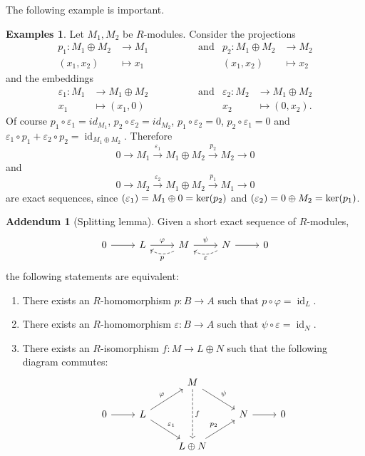 \documentclass[12pt,a4paper]{report}
\theoremstyle{definition}
\newtheorem*{addendum}{Addendum}
\newtheorem*{examples}{Examples}
\theoremstyle{num.custom-title}
\DeclareMathOperator{\id}{id}
\let\o\relax %
\DeclareMathOperator{\o}{\mathsf{o}}
\let\Im\relax %
\DeclareMathOperator{\Im}{Im}
\renewcommand{\epsilon}{\varepsilon}
\renewcommand{\phi}{\varphi}
\begin{document}
The following example is important.

\begin{examples}
Let $M_1,M_2$ be $R$-modules. Consider the projections
\begin{align*}
p_1 \colon M_1 \oplus M_2 &\to M_1  \quad \quad \quad \quad \quad \text{and}  & p_2 \colon M_1 \oplus M_2 &\to M_2 \\
(x_1,x_2) &\mapsto x_1    &(x_1,x_2) &\mapsto x_2
\end{align*}
and the embeddings
\begin{align*}
\epsilon_1 \colon M_1 &\to M_1 \oplus M_2  \quad \quad \quad \quad \quad \text{and}  & \epsilon_2 \colon M_2 &\to M_1 \oplus M_2 \\
x_1 &\mapsto (x_1,0)    & x_2 &\mapsto (0,x_2).
\end{align*}
Of course $p_1 \circ \epsilon_1 = id_{M_1}$, $p_2 \circ \epsilon_2 = id_{M_2}$, $p_1 \circ \epsilon_2 = 0$, $p_2 \circ \epsilon_1 = 0$ and $\epsilon_1 \circ p_1 + \epsilon_2 \circ p_2 = \id_{M_1 \oplus M_2}$. Therefore
\[
0 \to M_1 \stackrel{\epsilon_1}{\to} M_1 \oplus M_2 \stackrel{p_2}{\to} M_2 \to 0
\]
and
\[
0 \to M_2 \stackrel{\epsilon_2}{\to} M_1 \oplus M_2 \stackrel{p_1}{\to} M_1 \to 0
\]
are exact sequences, since $\Im(\epsilon_1) = M_1 \oplus 0 = \ker(p_2)$ and $\Im(\epsilon_2) = 0 \oplus M_2 = \ker(p_1)$.
\end{examples}

\begin{addendum}[Splitting lemma]
Given a short exact sequence of $R$-modules, 
\[
\begin{tikzcd}
0 \arrow{r} & L \arrow{r}{\phi} & M \arrow{r}{\psi} \arrow[dashrightarrow, bend left]{l}{p} & N \arrow{r}{} \arrow[dashrightarrow, bend left]{l}{\epsilon} & 0
\end{tikzcd}
\]
the following statements are equivalent:
\begin{enumerate}
\item There exists an $R$-homomorphism $p : B \to A$ such that $p \circ \phi = \id_L$.
\item There exists an $R$-homomorphism $\epsilon : B \to A$ such that $\psi \circ \epsilon = \id_N$.
\item There exists an $R$-isomorphism $f : M \to L \oplus N$ such that the following diagram commutes:
\[
\begin{tikzcd}
\ & & M \arrow[dashrightarrow]{dd}{f} \arrow{rd}{\psi} & & \\
0 \arrow{r} & L \arrow{ru}{\phi} \arrow{rd}{\epsilon_1} & & N \arrow{r}{} & 0 \\
& & L \oplus N \arrow{ru}{p_2} & &
\end{tikzcd}
\]
\end{enumerate}
\end{addendum}
\end{document}
